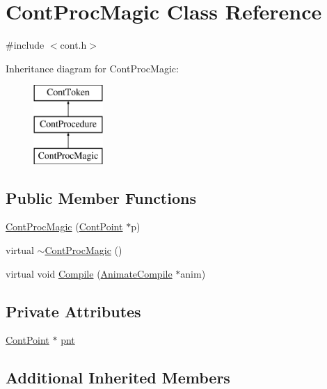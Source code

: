 \hypertarget{a00076}{\section{Cont\-Proc\-Magic Class Reference}
\label{a00076}
}


{\ttfamily \#include $<$cont.\-h$>$}

Inheritance diagram for Cont\-Proc\-Magic\-:\begin{figure}[H]
\begin{center}
\leavevmode
\includegraphics[height=3.000000cm]{a00076}
\end{center}
\end{figure}
\subsection*{Public Member Functions}
\begin{DoxyCompactItemize}
\item 
\hyperlink{a00076_ac797037f02a70a614c448484025cb825}{Cont\-Proc\-Magic} (\hyperlink{a00062}{Cont\-Point} $\ast$p)
\item 
virtual \hyperlink{a00076_abb9d43e35525051fd0b200899f4c5412}{$\sim$\-Cont\-Proc\-Magic} ()
\item 
virtual void \hyperlink{a00076_af65d4df561241982cdfda99425a6f42e}{Compile} (\hyperlink{a00007}{Animate\-Compile} $\ast$anim)
\end{DoxyCompactItemize}
\subsection*{Private Attributes}
\begin{DoxyCompactItemize}
\item 
\hyperlink{a00062}{Cont\-Point} $\ast$ \hyperlink{a00076_aeddee0118a33add02ef57c4811439b12}{pnt}
\end{DoxyCompactItemize}
\subsection*{Additional Inherited Members}


